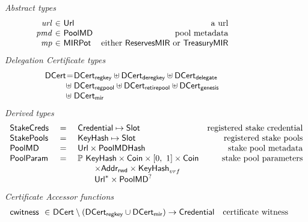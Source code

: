 \begin{figure}[htb]
  \emph{Abstract types}
  \begin{equation*}
    \begin{array}{r@{~\in~}lr}
      \var{url} & \URL & \text{a url}\\
      \var{pmd} & \PoolMD & \text{pool metadata}\\
      \var{mp} & \MIRPot & \text{either $\ReservesMIR$ or $\TreasuryMIR$}\\
    \end{array}
  \end{equation*}
  \emph{Delegation Certificate types}
  \begin{equation*}
  \begin{array}{r@{}c@{}l}
    \DCert &=& \DCertRegKey \uniondistinct \DCertDeRegKey \uniondistinct \DCertDeleg \\
                &\hfill\uniondistinct\;&
                \DCertRegPool \uniondistinct \DCertRetirePool \uniondistinct
                                         \DCertGen\\
           &\hfill\uniondistinct\;& \DCertMir
  \end{array}
  \end{equation*}
  \emph{Derived types}
  \begin{equation*}
    \begin{array}{lclr}
      \mathsf{StakeCreds}
      & ~=~
      & \mathsf{Credential} \mapsto \mathsf{Slot}
      & \text{registered stake credential} \\
      \mathsf{StakePools}
      & ~=~
      & \mathsf{KeyHash} \mapsto \mathsf{Slot}
      & \text{registered stake pools} \\
      \mathsf{PoolMD}
      & ~=~
      & \mathsf{Url} \times \mathsf{PoolMDHash}
      & \text{stake pool metadata} \\
      \mathsf{PoolParam}
      & ~=~
      & \mathbb{P}~\mathsf{KeyHash} \times \mathsf{Coin} \times [0,~1] \times \mathsf{Coin}
      & \text{stake pool parameters} \\
      & & \qquad \times \mathsf{Addr_{rwd}} \times \mathsf{KeyHash}_{vrf} \\
      & & \qquad \mathsf{Url}^{*} \times \mathsf{PoolMD}^?
    \end{array}
  \end{equation*}
  \emph{Certificate Accessor functions}
  \begin{equation*}
    \begin{array}{r@{~\in~}lr}
      \cwitness{} & \DCert\setminus(\DCertRegKey\cup\DCertMir) \to \Credential & \text{certificate witness} \\

\end{array}
\end{equation*}
\end{figure}

